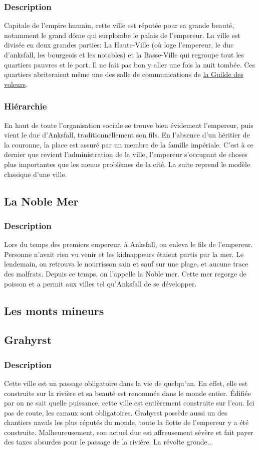 \subsubsection{Description}
\hypertarget{anksfall}{}Capitale de l'empire humain, cette ville est réputée pour sa grande beauté,
notamment le grand dôme qui surplombe le palais de l'empereur. 
La ville est divisée en deux grandes parties: La Haute-Ville 
(où loge l’empereur, le duc d'anksfall, les bourgeois et les notables)
et la Basse-Ville qui regroupe tout les quartiers pauvres et le port.
Il ne fait pas bon y aller une fois la nuit tombée.
Ces quartiers abriteraient même une des salle de communications de \hyperlink {laguildedesvoleurs}{la Guilde des voleurs}.
\subsubsection{Hiérarchie}
En haut de toute l'organisation sociale se trouve bien évidement l’empereur, puis vient le duc d’Anksfall, traditionnellement son fils. En l’absence d’un héritier de la couronne, la place est assuré par un membre de la famille impériale. C’est à ce dernier que revient l’administration de la ville, l’empereur s’occupant de choses plus importantes que les menus problèmes de la cité. La suite reprend le modèle classique d’une ville. 
\subsection{La Noble Mer}
\subsubsection{Description}
\hypertarget{lanoblemer}{}Lors du temps des premiers empereur, à Anksfall, on enleva le fils de l'empereur.
Personne n'avait rien vu venir et les kidnappeurs étaient partis par la mer. 
Le lendemain, on retrouva le nourrisson sain  et sauf sur une plage, et aucune trace des malfrats.
Depuis ce temps, on l'appelle la Noble mer.
Cette mer regorge de poisson et a permit aux villes tel qu'Anksfall de se développer.
\subsection{Les monts mineurs}
\subsection{Grahyrst}
\subsubsection{Description}
\hypertarget {grahyrst}{}Cette ville est un passage obligatoire dans la vie de quelqu’un. En effet, elle est construite sur la rivière et sa beauté est renommée dans le monde entier. Édifiée par on ne sait quelle puissance, cette ville est entièrement construite sur l’eau. Ici pas de route, les canaux sont obligatoires. Grahyrst possède aussi un des chantiers navals les plus réputés du monde, toute la flotte de l’empereur y a été construite. Malheureusement, son actuel duc est affreusement sévère et fait payer des taxes absurdes pour le passage de la rivière. La révolte gronde...
